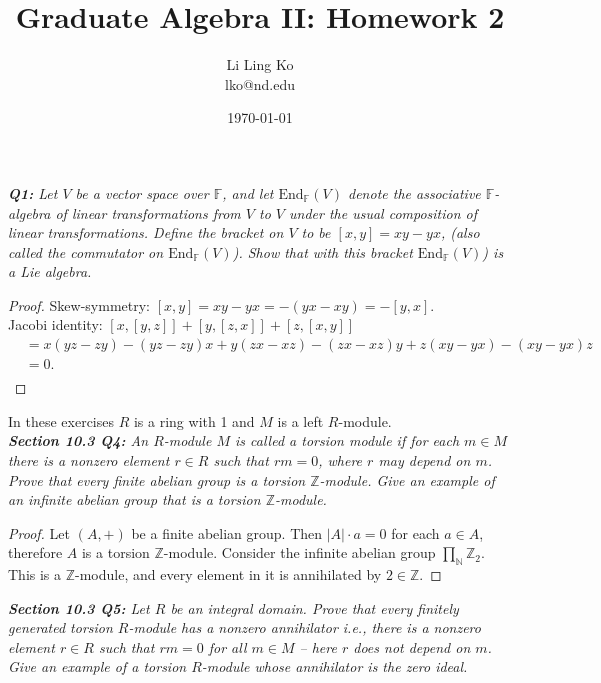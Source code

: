 \documentclass{article}
\begin{document}
\title{Graduate Algebra II: Homework 2}
\author{Li Ling Ko\\ lko@nd.edu}
\date{\today}
\maketitle

\it \textbf{Q1:} Let $V$ be a vector space over $\mathbb{F}$, and let
  $\text{End}_{\mathbb{F}}(V)$ denote the associative $\mathbb{F}$-algebra
  of linear transformations from $V$ to $V$ under the usual composition of
  linear transformations. Define the bracket on $V$ to be $[x,y]=xy-yx$,
  (also called the commutator on $\text{End}_{\mathbb{F}}(V)$). Show that
  with this bracket $\text{End}_{\mathbb{F}}(V)$) is a Lie algebra.

  \begin{proof}
    Skew-symmetry: $[x,y]=xy-yx=-(yx-xy)=-[y,x]$. \\
    Jacobi identity: $[x,[y,z]]+[y,[z,x]]+[z,[x,y]]$
    \begin{align*}
      &=x(yz-zy)-(yz-zy)x +y(zx-xz)-(zx-xz)y +z(xy-yx)-(xy-yx)z\\
      &=0.\\
    \end{align*}
  \end{proof}

In these exercises $R$ is a ring with 1 and $M$ is a left $R$-module. \\

\it \textbf{Section 10.3 Q4:} An $R$-module $M$ is called a torsion module
  if for each $m\in M$ there is a nonzero element $r\in R$ such that
  $rm=0$, where $r$ may depend on $m$. Prove that every finite abelian
  group is a torsion $\mathbb{Z}$-module. Give an example of an infinite
  abelian group that is a torsion $\mathbb{Z}$-module.

  \begin{proof}
    Let $(A,+)$ be a finite abelian group. Then $|A|\cdot a=0$ for each
    $a\in A$, therefore $A$ is a torsion $\mathbb{Z}$-module. Consider the
    infinite abelian group $\prod_{\mathbb{N}}\mathbb{Z}_2$. This is a
    $\mathbb{Z}$-module, and every element in it is annihilated by
    $2\in\mathbb{Z}$.
  \end{proof}

\it \textbf{Section 10.3 Q5:} Let $R$ be an integral domain. Prove that
  every finitely generated torsion $R$-module has a nonzero annihilator
  i.e., there is a nonzero element $r\in R$ such that $rm=0$ for all $m\in
  M$ -- here $r$ does not depend on $m$. Give an example of a torsion
  $R$-module whose annihilator is the zero ideal.
\end{document}
